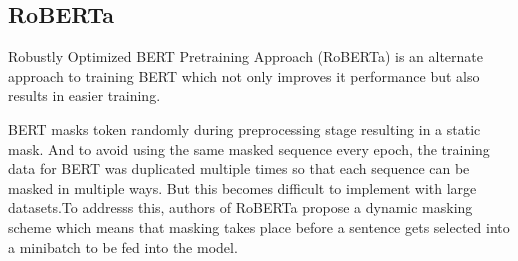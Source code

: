 \subsection{RoBERTa}

Robustly Optimized BERT Pretraining Approach (RoBERTa) is an alternate approach to training BERT which not only improves it performance but also results in easier training\cite{liu2019roberta}.

BERT masks token randomly during preprocessing stage resulting in a static mask. And to avoid using the same masked sequence every epoch, the training data for BERT was duplicated multiple times so that each sequence can be masked in multiple ways. But this becomes difficult to implement with large datasets.To addresss this, authors of RoBERTa propose a dynamic masking scheme which means that masking takes place before a sentence gets selected into a minibatch to be fed into the model.